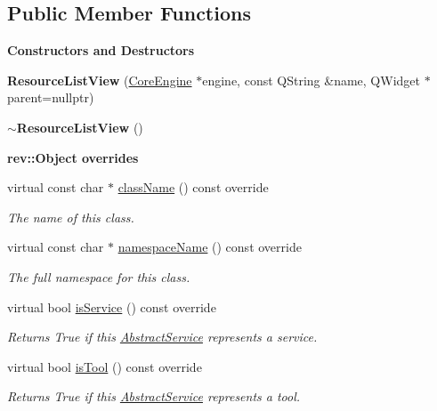 \subsection*{Public Member Functions}
\begin{Indent}\textbf{ Constructors and Destructors}\par
\begin{DoxyCompactItemize}
\item 
\mbox{\label{classrev_1_1_view_1_1_resource_list_view_ad383c1d51ed239adc804fdbfc25f7d61}} 
{\bfseries Resource\+List\+View} (\mbox{\hyperlink{classrev_1_1_core_engine}{Core\+Engine}} $\ast$engine, const Q\+String \&name, Q\+Widget $\ast$parent=nullptr)
\item 
\mbox{\label{classrev_1_1_view_1_1_resource_list_view_ab95b55f93e44c921d9af86bdb480be0d}} 
{\bfseries $\sim$\+Resource\+List\+View} ()
\end{DoxyCompactItemize}
\end{Indent}
\begin{Indent}\textbf{ rev\+::Object overrides}\par
\begin{DoxyCompactItemize}
\item 
virtual const char $\ast$ \mbox{\hyperlink{classrev_1_1_view_1_1_resource_list_view_a2e12909ec3f4986fb0d2d3edd0987ba6}{class\+Name}} () const override
\begin{DoxyCompactList}\small\item\em The name of this class. \end{DoxyCompactList}\item 
virtual const char $\ast$ \mbox{\hyperlink{classrev_1_1_view_1_1_resource_list_view_a58c6e30384ae07c1de6fe33efd9c0eb3}{namespace\+Name}} () const override
\begin{DoxyCompactList}\small\item\em The full namespace for this class. \end{DoxyCompactList}\item 
virtual bool \mbox{\hyperlink{classrev_1_1_view_1_1_resource_list_view_a3f9f3fe3bc14956972b7a2aad876dd97}{is\+Service}} () const override
\begin{DoxyCompactList}\small\item\em Returns True if this \mbox{\hyperlink{classrev_1_1_abstract_service}{Abstract\+Service}} represents a service. \end{DoxyCompactList}\item 
virtual bool \mbox{\hyperlink{classrev_1_1_view_1_1_resource_list_view_a9a2dd9e4b97e4018bd44f0f26c695906}{is\+Tool}} () const override
\begin{DoxyCompactList}\small\item\em Returns True if this \mbox{\hyperlink{classrev_1_1_abstract_service}{Abstract\+Service}} represents a tool. \end{DoxyCompactList}\end{DoxyCompactItemize}
\end{Indent}
